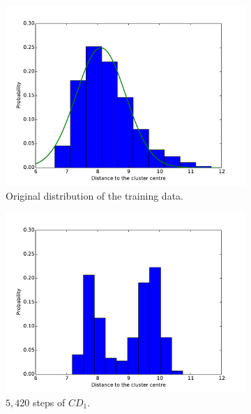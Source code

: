 \begin{figure}[hbt]
  \centering
		\begin{subfigure}[t]{0.18\textwidth}
			\includegraphics[width=\textwidth]{pics_sdbn/train_dist.pdf}
		    \caption{Original distribution of the training data.}
		\end{subfigure}
		\begin{subfigure}[t]{0.18\textwidth}
			\includegraphics[width=\textwidth]{pics_sdbn/cd1_1.pdf}
		    \caption{$5,420$ steps of $CD_1$.}
		\end{subfigure}
		\begin{subfigure}[t]{0.18\textwidth}

\end{subfigure}
\end{figure}
